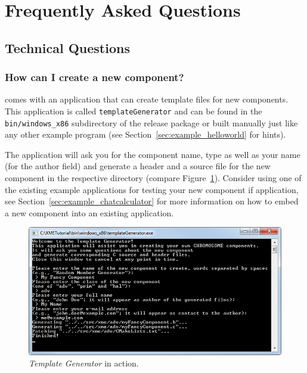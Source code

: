 %
% 
%
%
%
%

\section{Frequently Asked Questions}
\label{appx:faq}

\subsection{Technical Questions}

\subsubsection{How can I create a new component?}
\label{faq:create_component}

\xme comes with an application that can create template files for new components.
This application is called \verb|templateGenerator| and can be found in the \verb|bin/windows_x86|
subdirectory of the release package or built manually just like any other \xme example program (see Section~\ref{sec:example_helloworld} for hints).

The application will ask you for the component name, type as well as your name (for the author field)
and generate a header and a source file for the new component in the respective directory (compare Figure~\ref{fig:example_templateGenerator}).
Consider using one of the existing example applications for testing your new component if application, see Section~\ref{sec:example_chatcalculator}
for more information on how to embed a new component into an existing application.

\begin{figure}[htbp]
	\centering
	\includegraphics[scale=0.75]{figures/PNG/example_templateGenerator.png}
	\caption{\emph{Template Generator} in action.}
	\label{fig:example_templateGenerator}
\end{figure}

